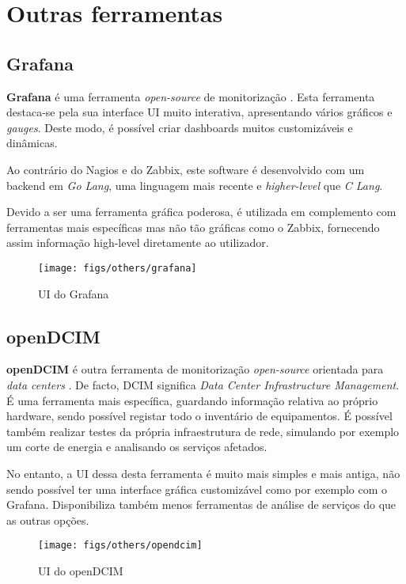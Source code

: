 \chapter {Outras ferramentas}

\section{Grafana}

\textbf{Grafana} é uma ferramenta \textit{open-source} de monitorização \cite{Grafana}.
Esta ferramenta destaca-se pela sua interface UI muito interativa, apresentando vários gráficos e \textit{gauges}.
Deste modo, é possível criar dashboards muitos customizáveis e dinâmicas.

Ao contrário do Nagios e do Zabbix, este software é desenvolvido com um backend em \textit{Go Lang}, uma linguagem mais recente e \textit{higher-level} que \textit{C Lang}.

Devido a ser uma ferramenta gráfica poderosa, é utilizada em complemento com ferramentas mais específicas mas não tão gráficas como o Zabbix, fornecendo assim informação high-level diretamente ao utilizador.

\begin{figure}[H]
    \centering
    \texttt{[image: figs/others/grafana]}
    \caption{UI do Grafana}
    \label{fig:grafana}
\end{figure}

\pagebreak

\section{openDCIM}

\textbf{openDCIM} é outra ferramenta de monitorização \textit{open-source} orientada para \textit{data centers} \cite{openDCIM}.
De facto, DCIM significa \textit{Data Center Infrastructure Management}.
É uma ferramenta mais específica, guardando informação relativa ao próprio hardware, sendo possível registar todo o inventário de equipamentos.
É possível também realizar testes da própria infraestrutura de rede, simulando por exemplo um corte de energia e analisando os serviços afetados.

No entanto, a UI dessa desta ferramenta é muito mais simples e mais antiga, não sendo possível ter uma interface gráfica customizável como por exemplo com o Grafana.
Disponibiliza também menos ferramentas de análise de serviços do que as outras opções.

\begin{figure}[H]
    \centering
    \texttt{[image: figs/others/opendcim]}
    \caption{UI do openDCIM}
    \label{fig:opendcim}
\end{figure}


